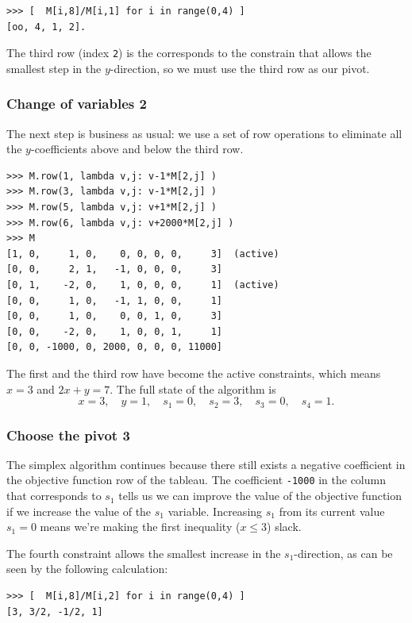 \documentclass[11pt,oneside]{article}
\begin{document}
\begin{verbatim}
>>> [  M[i,8]/M[i,1] for i in range(0,4) ]
[oo, 4, 1, 2].
\end{verbatim}

	\noindent
	The third row (index \texttt{2}) is the corresponds to the constrain that allows the smallest step
	in the $y$-direction,  so we must use the third row as our pivot.
	
	\subsubsection{Change of variables 2}	
	The next step is business as usual: we use a set of row operations to eliminate all the 
	$y$-coefficients above and below the third row.
	
\begin{verbatim}
>>> M.row(1, lambda v,j: v-1*M[2,j] )
>>> M.row(3, lambda v,j: v-1*M[2,j] )
>>> M.row(5, lambda v,j: v+1*M[2,j] )
>>> M.row(6, lambda v,j: v+2000*M[2,j] )
>>> M
[1, 0,     1, 0,    0, 0, 0, 0,     3]  (active)
[0, 0,     2, 1,   -1, 0, 0, 0,     3]
[0, 1,    -2, 0,    1, 0, 0, 0,     1]  (active)
[0, 0,     1, 0,   -1, 1, 0, 0,     1]
[0, 0,     1, 0,    0, 0, 1, 0,     3]
[0, 0,    -2, 0,    1, 0, 0, 1,     1]
[0, 0, -1000, 0, 2000, 0, 0, 0, 11000]
\end{verbatim}

	\noindent
	The first and the third row have become the active constraints,
	which means $x= 3$ and $2x+y= 7$.
	The full state of the algorithm is
	\[
		x=3, \quad y=1, \quad s_1=0, \quad s_2=3,  \quad s_3=0, \quad s_4=1.
	\]	

	
	
	\bigskip
	
	\subsubsection{Choose the pivot 3}
	The simplex algorithm continues because there still exists a negative coefficient
	in the objective function row of the tableau.
	The coefficient \texttt{-1000} in the column that corresponds to $s_1$ tells us 
	we can improve the value of the objective function if we increase the value of the $s_1$ variable.
	Increasing $s_1$ from its current value $s_1=0$ means we're making the first inequality ($x\leq3$) slack.

	The fourth constraint allows the smallest increase in the $s_1$-direction,
	as can be seen by the following calculation:	
\begin{verbatim}
>>> [  M[i,8]/M[i,2] for i in range(0,4) ]
[3, 3/2, -1/2, 1]
\end{verbatim}
\end{document}
